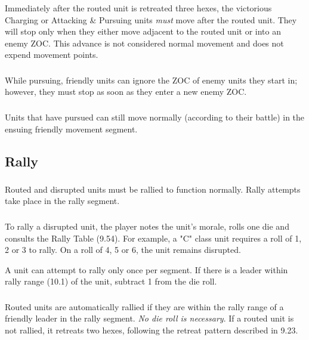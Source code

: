 \subsubsection[When Pursuit Stops]{} Immediately after the routed unit is retreated three hexes, the victorious Charging or Attacking \& Pursuing units \textit{must} move after the routed unit. They will stop only when they either move adjacent to the routed unit or into an enemy ZOC. This advance is not considered normal movement and does not expend movement points.

\subsubsection[Enemy ZOCs]{} While pursuing, friendly units can ignore the ZOC of enemy units they start in; however, they must stop as soon as they enter a new enemy ZOC.

\subsubsection[Followup Movement]{} Units that have pursued can still move normally (according to their battle) in the ensuing friendly movement segment.

\subsection{Rally}

\subsubsection[When Rally Happens]{} Routed and disrupted units must be rallied to function normally. Rally attempts take place in the rally segment.

\subsubsection[How to Rally]{} To rally a disrupted unit, the player notes the unit's morale, rolls one die and consults the Rally Table (9.54). For example, a "C" class unit requires a roll of 1, 2 or 3 to rally. On a roll of 4, 5 or 6, the unit remains disrupted.

A unit can attempt to rally only once per segment. If there is a leader within rally range (10.1) of the unit, subtract 1 from the die roll.

\subsubsection[Routed Units]{} Routed units are automatically rallied if they are within the rally range of a friendly leader in the rally segment. \textit{No die roll is necessary}. If a routed unit is not rallied, it retreats two hexes, following the retreat pattern described in 9.23.

